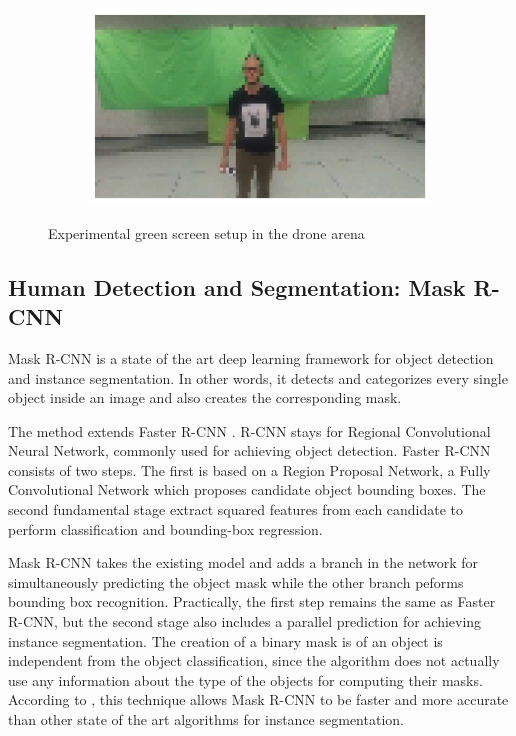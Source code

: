 \begin{figure}[!h]
\begin{center}
\begin{subfigure}[h]{0.24\textwidth}
		\end{subfigure}
		\hfill
		\begin{subfigure}[h]{0.24\textwidth}
			\centering
			\includegraphics[width=1\textwidth]{"contents/images/04-greenscreen-4"}
		\end{subfigure}
	\end{center}
	\vspace{-0.5cm}
	\caption[Experimental green screen setup in the drone arena]{Experimental green screen setup in the drone arena}
	\label{fig:greenscreen}
\end{figure}



\subsection{Human Detection and Segmentation: Mask R-CNN}
\label{subsec:sota-maskrcnn}

Mask R-CNN \cite{he2018mask} is a state of the art deep learning framework for object detection and instance segmentation. In other words, it detects and categorizes every single object inside an image and also creates the corresponding mask.

The method extends Faster R-CNN \cite{ren2016faster}. R-CNN stays for Regional Convolutional Neural Network, commonly used for achieving object detection. Faster R-CNN consists of two steps. The first is based on a Region Proposal Network, a Fully Convolutional Network \cite{shelhamer2016fully} which proposes candidate object bounding boxes. The second fundamental stage extract squared features from each candidate to perform classification and bounding-box regression. 

Mask R-CNN takes the existing model and adds a branch in the network for simultaneously predicting the object mask while the other branch peforms bounding box recognition. Practically, the first step remains the same as Faster R-CNN, but the second stage also includes a parallel prediction for achieving instance segmentation. The creation of a binary mask is of an object is independent from the object classification, since the algorithm does not actually use any information about the type of the objects for computing their masks. According to \cite{he2018mask}, this technique allows Mask R-CNN to be faster and more accurate than other state of the art algorithms for instance segmentation.

